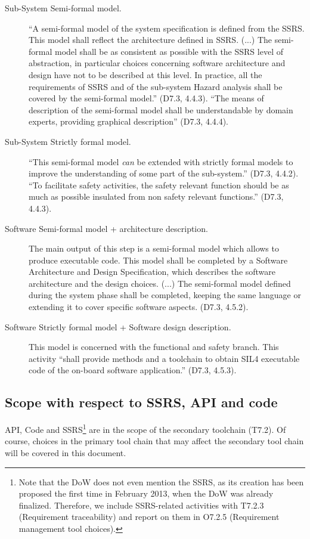 \begin{description}
  \item [Sub-System Semi-formal model.]  ``A semi-formal model of the system specification is defined from the SSRS. This model shall reflect the architecture defined in SSRS. (...) The semi-formal model shall be as consistent as possible with the SSRS level of abstraction, in particular choices concerning
software architecture and design have not to be described at this level. In practice, all the requirements of SSRS and of the sub-system Hazard analysis shall be covered by the semi-formal model.'' (D7.3, 4.4.3).  ``The means of description of the semi-formal model shall be understandable by domain experts, providing graphical description'' (D7.3, 4.4.4).

  \item [Sub-System Strictly formal model.] ``This semi-formal model \emph{can} be extended with strictly formal models to improve the understanding of some part of the sub-system.'' (D7.3, 4.4.2).  ``To facilitate safety activities, the safety relevant function should be as much as possible insulated from non safety relevant functions.'' (D7.3, 4.4.3).

  \item [Software Semi-formal model + architecture description.] The main output of this step is a semi-formal model which allows to produce executable code. This model shall be completed by a Software Architecture and Design Specification, which describes the software architecture and the design choices. (...) The semi-formal model defined during the system phase shall be completed, keeping the same language or extending it to cover specific software aspects. (D7.3, 4.5.2).

  \item [Software Strictly formal model + Software design description.]  This model is concerned with the functional and safety branch.  This activity ``shall provide methods and a toolchain to obtain SIL4 executable code of the on-board software application.'' (D7.3, 4.5.3).

\end{description}

\subsection{Scope with respect to SSRS, API and code}

API, Code and SSRS\footnote{Note that the DoW does not even mention the SSRS, as its creation has been proposed the first time in February 2013, when the DoW was already finalized.  Therefore, we include SSRS-related activities with T7.2.3 (Requirement traceability) and report on them in O7.2.5 (Requirement management tool choices).}  are in the scope of the secondary toolchain (T7.2).  Of course, choices in the primary tool chain that may affect the secondary tool chain will be covered in this document.

